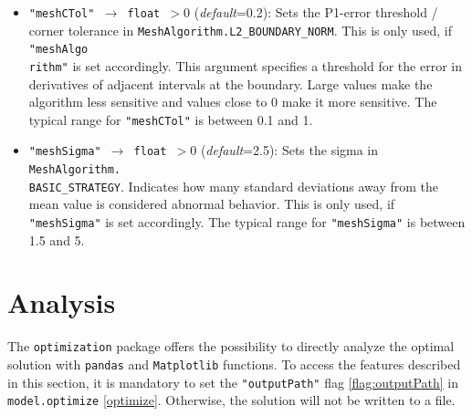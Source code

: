 \documentclass[12pt]{article}
\begin{document}
\begin{mdframed}[backgroundcolor=gray!10, roundcorner=10pt,
		linewidth=1pt]
\begin{itemize}
		      \label{flag:meshCTol}
		\item \texttt{"meshCTol" $\rightarrow$ float $> 0$}
		      (\emph{default}=0.2): Sets the P1-error threshold / corner tolerance in
		      \texttt{MeshAlgorithm.L2\_BOUNDARY\_NORM}. This is only used, if
		      \texttt{"meshAlgo\\rithm"} is set accordingly. This argument specifies a
		      threshold for the error in derivatives of adjacent intervals at the boundary.
		      Large values make the algorithm less sensitive and values close to 0 make it
		      more sensitive.
		      The typical range for \texttt{"meshCTol"} is between 0.1 and 1.

		      \label{flag:meshSigma}
		\item \texttt{"meshSigma" $\rightarrow$ float $> 0$}
		      (\emph{default}=2.5): Sets the sigma in
		      \texttt{MeshAlgorithm.\\BASIC\_STRATEGY}. Indicates how many standard
		      deviations away from the mean value is considered abnormal behavior. This is
		      only used, if \texttt{"meshSigma"} is set accordingly.
		      The typical range for \texttt{"meshSigma"} is between 1.5 and 5.

	\end{itemize}

\end{mdframed}

\section{Analysis}
\label{c:Analysis}
The \texttt{optimization} package offers the possibility to directly analyze the optimal solution with  \texttt{pandas} and \texttt{Matplotlib} functions. To access the features described in this section, it is mandatory to set the \texttt{"outputPath"} flag \eqref{flag:outputPath} in \texttt{model.optimize} \eqref{optimize}. Otherwise, the solution will not be written to a file.
\end{document}
